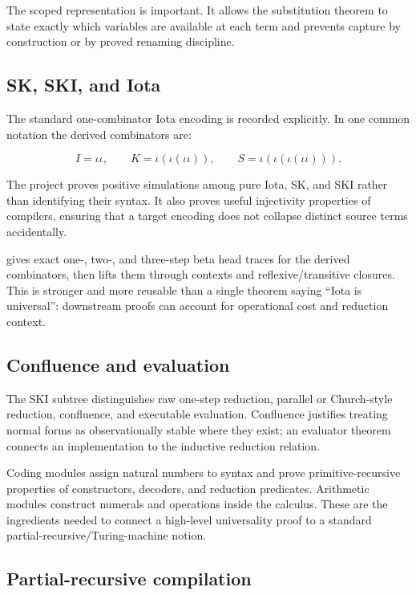 \documentclass[
  10pt,
  a4paper,
  twoside,
  open=any,
  parskip=half,
  headings=big
]{scrreprt}
\newcommand{\code}[1]{\texttt{\detokenize{#1}}}
\begin{document}
The scoped representation is important.  It allows the substitution theorem
to state exactly which variables are available at each term and prevents
capture by construction or by proved renaming discipline.

\subsection{SK, SKI, and Iota}

The standard one-combinator Iota encoding is recorded explicitly.  In one
common notation the derived combinators are:

\[
 I = \iota\iota,\qquad
 K = \iota(\iota(\iota\iota)),\qquad
 S = \iota(\iota(\iota(\iota\iota))).
\]

The project proves positive simulations among pure Iota, SK, and SKI rather
than identifying their syntax.  It also proves useful injectivity properties
of compilers, ensuring that a target encoding does not collapse distinct
source terms accidentally.

\code{IotaToLambda.lean} gives exact one-, two-, and three-step beta head
traces for the derived combinators, then lifts them through contexts and
reflexive/transitive closures.  This is stronger and more reusable than a
single theorem saying ``Iota is universal'': downstream proofs can account for
operational cost and reduction context.

\subsection{Confluence and evaluation}

The SKI subtree distinguishes raw one-step reduction, parallel or
Church-style reduction, confluence, and executable evaluation.  Confluence
justifies treating normal forms as observationally stable where they exist;
an evaluator theorem connects an implementation to the inductive reduction
relation.

Coding modules assign natural numbers to syntax and prove primitive-recursive
properties of constructors, decoders, and reduction predicates.  Arithmetic
modules construct numerals and operations inside the calculus.  These are the
ingredients needed to connect a high-level universality proof to a standard
partial-recursive/Turing-machine notion.

\subsection{Partial-recursive compilation}
\end{document}
